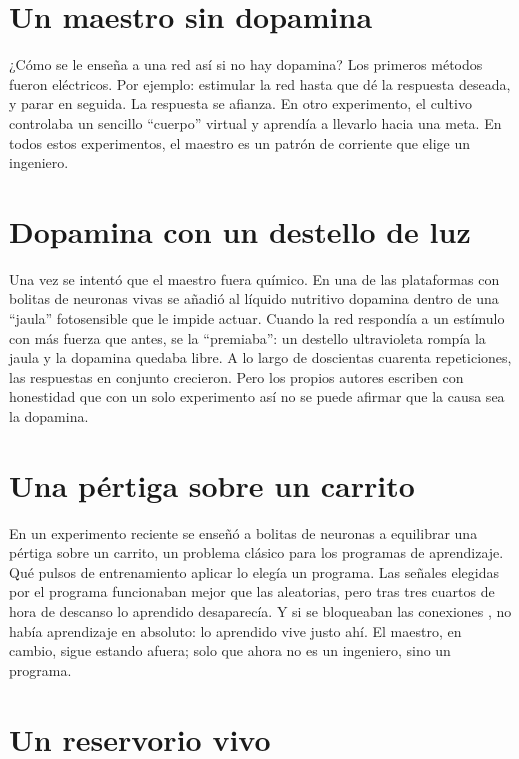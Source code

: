 \section*{Un maestro sin dopamina}

¿Cómo se le enseña a una red así si no hay dopamina? Los primeros métodos fueron eléctricos. Por ejemplo: estimular la red hasta que dé la respuesta deseada, y parar en seguida. La respuesta se afianza. En otro experimento, el cultivo controlaba un sencillo “cuerpo” virtual y aprendía a llevarlo hacia una meta. En todos estos experimentos, el maestro es un patrón de corriente que elige un ingeniero.

\section*{Dopamina con un destello de luz}

Una vez se intentó que el maestro fuera químico. En una de las plataformas con bolitas de neuronas vivas se añadió al líquido nutritivo dopamina dentro de una “jaula” fotosensible que le impide actuar. Cuando la red respondía a un estímulo con más fuerza que antes, se la “premiaba”: un destello ultravioleta rompía la jaula y la dopamina quedaba libre. A lo largo de doscientas cuarenta repeticiones, las respuestas en conjunto crecieron. Pero los propios autores escriben con honestidad que con un solo experimento así no se puede afirmar que la causa sea la dopamina.

\section*{Una pértiga sobre un carrito}

En un experimento reciente se enseñó a bolitas de neuronas a equilibrar una pértiga sobre un carrito, un problema clásico para los programas de aprendizaje. Qué pulsos de entrenamiento aplicar lo elegía un programa. Las señales elegidas por el programa funcionaban mejor que las aleatorias, pero tras tres cuartos de hora de descanso lo aprendido desaparecía. Y si se bloqueaban las conexiones , no había aprendizaje en absoluto: lo aprendido vive justo ahí. El maestro, en cambio, sigue estando afuera; solo que ahora no es un ingeniero, sino un programa.

\section*{Un reservorio vivo}

